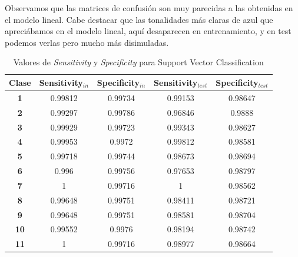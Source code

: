 \documentclass[10pt,a4paper]{article}
\begin{document}
Observamos que las matrices de confusión son muy parecidas a las obtenidas en el modelo lineal. Cabe destacar que las tonalidades más claras de azul que apreciábamos en el modelo lineal, aquí desaparecen en entrenamiento, y en test podemos verlas pero mucho más disimuladas.

\begin{table}[h]
	\centering
	\begin{tabular}{|c|c|c|c|c|}
		\hline
		\textbf{Clase} & \textbf{Sensitivity$_{in}$} & \textbf{Specificity$_{in}$} & \textbf{Sensitivity$_{test}$} & \textbf{Specificity$_{test}$} \\ \hline
		\textbf{1}     & 0.99812                     & 0.99734                     & 0.99153                       & 0.98647                       \\ \hline
		\textbf{2}     & 0.99297                     & 0.99786                     & 0.96846                       & 0.9888                        \\ \hline
		\textbf{3}     & 0.99929                     & 0.99723                     & 0.99343                       & 0.98627                       \\ \hline
		\textbf{4}     & 0.99953                     & 0.9972                      & 0.99812                       & 0.98581                       \\ \hline
		\textbf{5}     & 0.99718                     & 0.99744                     & 0.98673                       & 0.98694                       \\ \hline
		\textbf{6}     & 0.996                       & 0.99756                     & 0.97653                       & 0.98797                       \\ \hline
		\textbf{7}     & 1                           & 0.99716                     & 1                             & 0.98562                       \\ \hline
		\textbf{8}     & 0.99648                     & 0.99751                     & 0.98411                       & 0.98721                       \\ \hline
		\textbf{9}     & 0.99648                     & 0.99751                     & 0.98581                       & 0.98704                       \\ \hline
		\textbf{10}    & 0.99552                     & 0.9976                      & 0.98194                       & 0.98742                       \\ \hline
		\textbf{11}    & 1                           & 0.99716                     & 0.98977                       & 0.98664                       \\ \hline
	\end{tabular}
	\caption{Valores de \textit{Sensitivity} y \textit{Specificity} para Support Vector Classification}
	\label{fig:cla_sensit_specif_svc}
\end{table}
\end{document}
